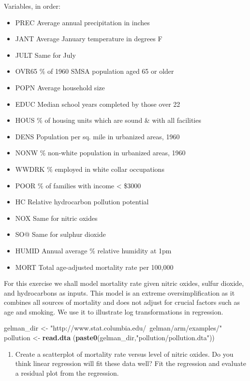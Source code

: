 \documentclass[]{article}
\newenvironment{Shaded}{\begin{snugshade}}{\end{snugshade}}
\newcommand{\KeywordTok}[1]{\textcolor[rgb]{0.13,0.29,0.53}{\textbf{#1}}}
\newcommand{\StringTok}[1]{\textcolor[rgb]{0.31,0.60,0.02}{#1}}
\newcommand{\NormalTok}[1]{#1}
\providecommand{\tightlist}{%
  \setlength{\itemsep}{0pt}\setlength{\parskip}{0pt}}
\begin{document}
Variables, in order:

\begin{itemize}
\tightlist
\item
  PREC Average annual precipitation in inches
\item
  JANT Average January temperature in degrees F
\item
  JULT Same for July
\item
  OVR65 \% of 1960 SMSA population aged 65 or older
\item
  POPN Average household size
\item
  EDUC Median school years completed by those over 22
\item
  HOUS \% of housing units which are sound \& with all facilities
\item
  DENS Population per sq. mile in urbanized areas, 1960
\item
  NONW \% non-white population in urbanized areas, 1960
\item
  WWDRK \% employed in white collar occupations
\item
  POOR \% of families with income \textless{} \$3000
\item
  HC Relative hydrocarbon pollution potential
\item
  NOX Same for nitric oxides
\item
  SO@ Same for sulphur dioxide
\item
  HUMID Annual average \% relative humidity at 1pm
\item
  MORT Total age-adjusted mortality rate per 100,000
\end{itemize}

For this exercise we shall model mortality rate given nitric oxides,
sulfur dioxide, and hydrocarbons as inputs. This model is an extreme
oversimplification as it combines all sources of mortality and does not
adjust for crucial factors such as age and smoking. We use it to
illustrate log transformations in regression.

\begin{Shaded}
\begin{Highlighting}[]
\NormalTok{gelman_dir   <-}\StringTok{ "http://www.stat.columbia.edu/~gelman/arm/examples/"}
\NormalTok{pollution    <-}\StringTok{ }\KeywordTok{read.dta}\NormalTok{ (}\KeywordTok{paste0}\NormalTok{(gelman_dir,}\StringTok{"pollution/pollution.dta"}\NormalTok{))}
\end{Highlighting}
\end{Shaded}

\begin{enumerate}
\def\labelenumi{\arabic{enumi}.}
\tightlist
\item
  Create a scatterplot of mortality rate versus level of nitric oxides.
  Do you think linear regression will fit these data well? Fit the
  regression and evaluate a residual plot from the regression.
\end{enumerate}
\end{document}
